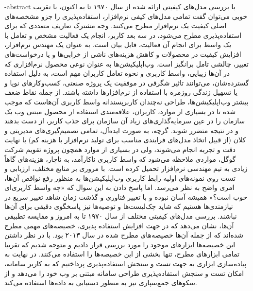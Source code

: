 \fa-abstract{
با بررسی مدل‌های کیفیتی ارائه شده از سال ۱۹۷۰ تا به اکنون، با تقریب خوبی می‌توان گفت تمامی مدل‌های کیفی نرم‌افزار، استفاده‌پذیری را جزو مشخصه‌های اصلی کیفیت یک نرم‌افزار مطرح می‌کنند. وجه مشترک تعاریف متعددی که برای استفاده‌پذیری مطرح می‌شود، در سه بعد کاربر، انجام یک فعالیت مشخص و تعامل با یک واسط برای انجام آن فعالیت، قابل بیان است. به عنوان یک مهندس نرم‌افزار، افزایش کیفیت در محصولات و کاهش هزینه‌های ناشی از خرابی‌ها و یا درخواست‌های تغییر، چالشی تامل برانگیز است. وب‌اپلیکیشن‌ها به عنوان نوعی محصول نرم‌افزاری که در آن‌ها زیبایی، واسط کاربری و نحوه تعامل کاربران مهم است، به دلیل استفاده گسترده‌شان، می‌توانند تاثیر شگرفی در موفقیت یک پروژه صنعتی، کسب‌وکارهای نوپا و یا تسهیل زندگی روزمره با استفاده از نرم‌افزارها داشته باشند. از جمله نقاط ضعف بیشتر وب‌اپلیکیشن‌ها، طراحی نه‌چندان کاربرپسندانه واسط کاربری آن‌هاست که موجب شده تا در بسیاری از موارد، کاربران، علاقه‌مندی استفاده از محصول مبتنی وب یک سازمان را در عین سرمایه‌گذاری‌های زیاد آن سازمان برای جذب کاربر، از دست بدهند و در نتیجه متضرر شوند. گرچه، به صورت ایده‌آل، تمامی تصمیم‌گیری‌های مدیریتی و کلان (از قبیل اتخاذ مدل‌های فرایندی مناسب برای تولید نرم‌افزار با هزینه کم) با نهایت دقت و تجربه انجام می‌شوند، ولی در بسیاری از موارد همچون پروژه تقویم شرکت گوگل، مواردی ملاحظه می‌شود که واسط کاربری ناکارآمد، به ناچار، هزینه‌های گاهاً زیادی به تیم مهندسی نرم‌افزار تحمیل کرده است. با مروری بر منابع مختلف، ارزیابی و تست روی نمونه‌های اولیه رابط کاربری وب‌اپلیکیشن‌ها به منظور رفع نواقص آن‌ها، امری واضح به نظر می‌رسد. اما پاسخ دادن به این سوال که «چه واسط کاربری‌ای خوب است؟» همیشه آسان نبوده و با تغییر فناوری و گذشت زمان شاهد تغییر سریع در نیازمندی‌ها هستیم که شاید چک‌لیست‌ها و توصیه‌ها نیز پاسخگوی دقیقی برای آن‌ها نباشند. بررسی مدل‌های کیفیتی مختلف از سال ۱۹۷۰ تا به امروز و مقایسه تطبیقی آن‌ها، نشان می‌دهد که در جهت افزایش استفاده پذیری، خصیصه‌های مهمی مطرح شده‌اند که از جمله آن‌ها خصیصه‌های مطرح شده در سال ۲۰۱۳ بود. با در نظر داشتن این خصیصه‌ها ابزارهای موجود را مورد بررسی قرار دادیم و متوجه شدیم که تقریبا تمامی ابزارهای مطرح، تنها بخشی از این خصیصه‌ها را استفاده می‌کنند. در نهایت به پیاده‌سازی ابزاری به جهت تست و سنجش استفاده‌پذیری پرداختیم که به کاربر سامانه، امکان تست و سنجش استفاده‌پذیری طراحی سامانه مبتنی بر وب خود را می‌دهد و از سکوهای جمع‌سپاری نیز به منظور دستیابی به داده‌ها استفاده می‌کند.
}





\AUTtitle
